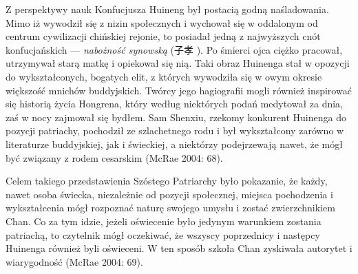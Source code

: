 Z perspektywy nauk Konfucjusza Huineng był postacią godną naśladowania.
Mimo iż wywodził się z nizin społecznych i wychował się w oddalonym od centrum cywilizacji chińskiej rejonie, to posiadał jedną z najwyższych cnót konfucjańskich --- \textit{nabożność synowską} (子孝 ).
Po śmierci ojca ciężko pracował, utrzymywał starą matkę i opiekował się nią.
Taki obraz Huinenga stał w opozycji do wykształconych, bogatych elit, z których wywodziła się w owym okresie większość mnichów buddyjskich.
Twórcy jego hagiografii mogli również inspirować się historią życia Hongrena, który według niektórych podań medytował za dnia, zaś w nocy zajmował się bydłem.
Sam Shenxiu, rzekomy konkurent Huinenga do pozycji patriachy, pochodził ze szlachetnego rodu i był wykształcony zarówno w literaturze buddyjskiej, jak i świeckiej, a niektórzy podejrzewają nawet, że mógł być związany z rodem cesarskim
(McRae 2004: 68).

Celem takiego przedstawienia Szóstego Patriarchy było pokazanie, że każdy, nawet osoba świecka, niezależnie od pozycji społecznej, miejsca pochodzenia i wykształcenia mógł rozpoznać naturę swojego umysłu i zostać zwierzchnikiem Chan.
Co za tym idzie, jeżeli oświecenie było jedynym warunkiem zostania patriachą, to czytelnik mógł oczekiwać, że wszyscy poprzednicy i następcy Huinenga również byli oświeceni.
W ten sposób szkoła Chan zyskiwała autorytet i wiarygodność (McRae 2004: 69).
